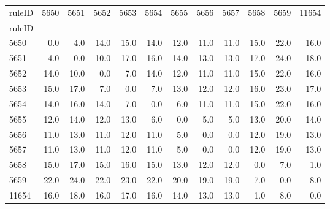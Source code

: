 \begin{tabular}{lrrrrrrrrrrr}
\toprule
ruleID &  5650 &  5651 &  5652 &  5653 &  5654 &  5655 &  5656 &  5657 &  5658 &  5659 &  11654 \\
ruleID &       &       &       &       &       &       &       &       &       &       &        \\
\midrule
5650   &   0.0 &   4.0 &  14.0 &  15.0 &  14.0 &  12.0 &  11.0 &  11.0 &  15.0 &  22.0 &   16.0 \\
5651   &   4.0 &   0.0 &  10.0 &  17.0 &  16.0 &  14.0 &  13.0 &  13.0 &  17.0 &  24.0 &   18.0 \\
5652   &  14.0 &  10.0 &   0.0 &   7.0 &  14.0 &  12.0 &  11.0 &  11.0 &  15.0 &  22.0 &   16.0 \\
5653   &  15.0 &  17.0 &   7.0 &   0.0 &   7.0 &  13.0 &  12.0 &  12.0 &  16.0 &  23.0 &   17.0 \\
5654   &  14.0 &  16.0 &  14.0 &   7.0 &   0.0 &   6.0 &  11.0 &  11.0 &  15.0 &  22.0 &   16.0 \\
5655   &  12.0 &  14.0 &  12.0 &  13.0 &   6.0 &   0.0 &   5.0 &   5.0 &  13.0 &  20.0 &   14.0 \\
5656   &  11.0 &  13.0 &  11.0 &  12.0 &  11.0 &   5.0 &   0.0 &   0.0 &  12.0 &  19.0 &   13.0 \\
5657   &  11.0 &  13.0 &  11.0 &  12.0 &  11.0 &   5.0 &   0.0 &   0.0 &  12.0 &  19.0 &   13.0 \\
5658   &  15.0 &  17.0 &  15.0 &  16.0 &  15.0 &  13.0 &  12.0 &  12.0 &   0.0 &   7.0 &    1.0 \\
5659   &  22.0 &  24.0 &  22.0 &  23.0 &  22.0 &  20.0 &  19.0 &  19.0 &   7.0 &   0.0 &    8.0 \\
11654  &  16.0 &  18.0 &  16.0 &  17.0 &  16.0 &  14.0 &  13.0 &  13.0 &   1.0 &   8.0 &    0.0 \\
\bottomrule
\end{tabular}
